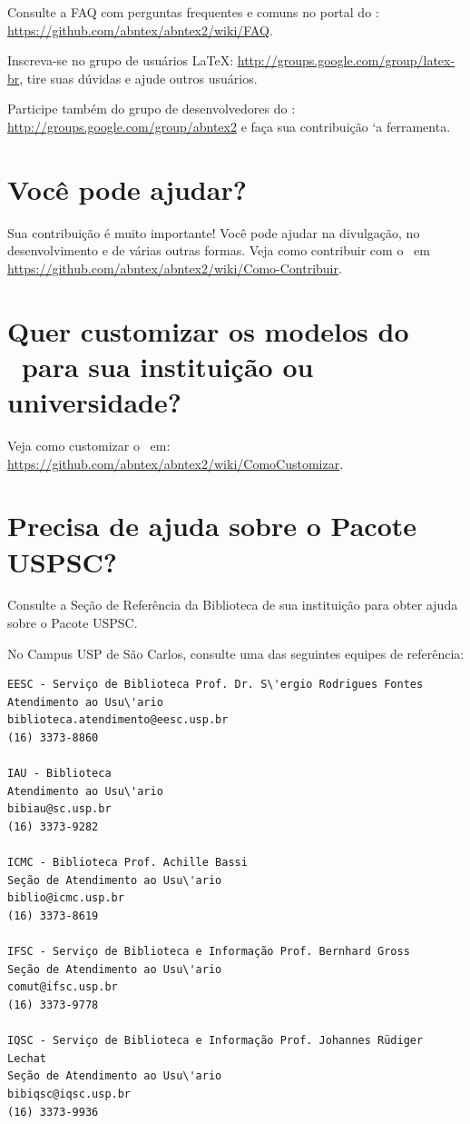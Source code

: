 Consulte a FAQ com perguntas frequentes e comuns no portal do \textsf{\abnTeX}:
\url{https://github.com/abntex/abntex2/wiki/FAQ}.

Inscreva-se no grupo de usu\'arios \LaTeX:
\url{http://groups.google.com/group/latex-br}, tire suas dúvidas e ajude
outros usu\'arios.

Participe tamb\'em do grupo de desenvolvedores do \textsf{\abnTeX}:
\url{http://groups.google.com/group/abntex2} e faça sua contribuição `a
ferramenta.

\section{Voc\^e pode ajudar?}

Sua contribuição \'e muito importante! Voc\^e pode ajudar na divulgação, no
desenvolvimento e de v\'arias outras formas. Veja como contribuir com o \abnTeX\
em \url{https://github.com/abntex/abntex2/wiki/Como-Contribuir}.

\section{Quer customizar os modelos do \abnTeX\ para sua instituição ou
universidade?}

Veja como customizar o \abnTeX\ em:
\url{https://github.com/abntex/abntex2/wiki/ComoCustomizar}.

\section{Precisa de ajuda sobre o Pacote USPSC?}
Consulte a Seção de Refer\^encia da Biblioteca de sua instituição para obter ajuda sobre o Pacote USPSC.

No Campus USP de São Carlos, consulte uma das seguintes equipes de refer\^encia:
\begin{verbatim}
EESC - Serviço de Biblioteca Prof. Dr. S\'ergio Rodrigues Fontes 
Atendimento ao Usu\'ario
biblioteca.atendimento@eesc.usp.br
(16) 3373-8860

IAU - Biblioteca
Atendimento ao Usu\'ario
bibiau@sc.usp.br
(16) 3373-9282

ICMC - Biblioteca Prof. Achille Bassi
Seção de Atendimento ao Usu\'ario
biblio@icmc.usp.br
(16) 3373-8619

IFSC - Serviço de Biblioteca e Informação Prof. Bernhard Gross
Seção de Atendimento ao Usu\'ario
comut@ifsc.usp.br
(16) 3373-9778

IQSC - Serviço de Biblioteca e Informação Prof. Johannes Rüdiger Lechat
Seção de Atendimento ao Usu\'ario
bibiqsc@iqsc.usp.br
(16) 3373-9936
\end{verbatim}


